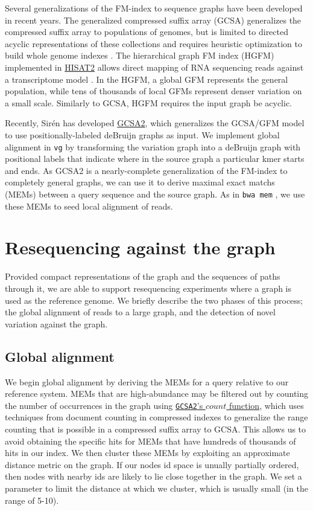 \documentclass{article}
\begin{document}
Several generalizations of the FM-index to sequence graphs have been developed in recent years.
The generalized compressed suffix array (GCSA) generalizes the compressed suffix array to populations of genomes, but is limited to directed acyclic representations of these collections and requires heuristic optimization to build whole genome indexes \cite{siren2011indexing, siren2014indexing}.
The hierarchical graph FM index (HGFM) implemented in \href{https://github.com/infphilo/hisat2}{HISAT2} allows direct mapping of RNA sequencing reads against a transcriptome model \cite{kim2015hisat}.
In the HGFM, a global GFM represents the general population, while tens of thousands of local GFMs represent denser variation on a small scale.
Similarly to GCSA, HGFM requires the input graph be acyclic.

Recently, Sirén has developed \href{https://github.com/jltsiren/gcsa2}{GCSA2}, which generalizes the GCSA/GFM model to use positionally-labeled deBruijn graphs as input.
We implement global alignment in {\tt vg} by transforming the variation graph into a deBruijn graph with positional labels that indicate where in the source graph a particular kmer starts and ends.
As GCSA2 is a nearly-complete generalization of the FM-index to completely general graphs, we can use it to derive maximal exact matchs (MEMs) between a query sequence and the source graph.
As in {\tt bwa mem} \cite{li2013bwamem}, we use these MEMs to seed local alignment of reads.


\section{Resequencing against the graph}

Provided compact representations of the graph and the sequences of paths through it, we are able to support resequencing experiments where a graph is used as the reference genome.
We briefly describe the two phases of this process; the global alignment of reads to a large graph, and the detection of novel variation against the graph.

\subsection{Global alignment}

We begin global alignment by deriving the MEMs for a query relative to our reference system.
MEMs that are high-abundance may be filtered out by counting the number of occurrences in the graph using \href{https://github.com/jltsiren/gcsa2/releases/tag/v0.6}{{\tt GCSA2}'s $count$ function}, which uses techniques from document counting in compressed indexes to generalize the range counting that is possible in a compressed suffix array to GCSA.
This allows us to avoid obtaining the specific hits for MEMs that have hundreds of thousands of hits in our index.
We then cluster these MEMs by exploiting an approximate distance metric on the graph.
If our nodes id space is unually partially ordered, then nodes with nearby ids are likely to lie close together in the graph.
We set a parameter to limit the distance at which we cluster, which is usually small (in the range of 5-10).
\end{document}
